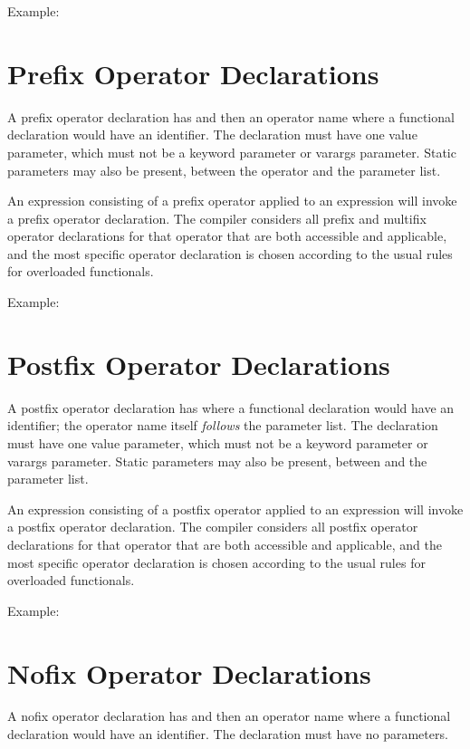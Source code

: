 Example:


\section{Prefix Operator Declarations}

A prefix operator declaration has 
and then an operator name where a
functional declaration would have an identifier.
The declaration must have one value parameter, which must not be a keyword parameter
or varargs parameter.
Static parameters may also be present, between the operator and the parameter list.

An expression consisting of a prefix operator applied to
an expression will invoke a prefix operator declaration.
The compiler considers all prefix and multifix
operator declarations for that
operator that are both
accessible and applicable, and the most specific operator declaration
is chosen according to the usual rules for overloaded functionals.

Example:


\section{Postfix Operator Declarations}

A postfix operator declaration has  where a
functional declaration would have an identifier;
the operator name itself \emph{follows} the parameter list.
The declaration must have one value parameter, which must not be a keyword parameter
or varargs parameter.
Static parameters may also be present, between 
and the parameter list.

An expression consisting of a postfix operator applied to
an expression will invoke a postfix operator declaration.
The compiler considers all postfix operator declarations for that
operator that are both
accessible and applicable, and the most specific operator declaration
is chosen according to the usual rules for overloaded functionals.

Example:



\section{Nofix Operator Declarations}

A nofix operator declaration has 
and then an operator name where a functional declaration would have an
identifier.  The declaration must have no parameters.

